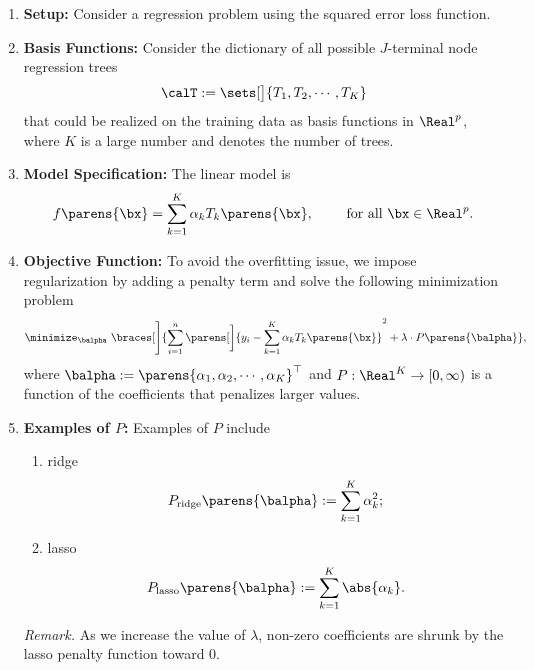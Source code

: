 \documentclass[12pt]{article}
\begin{document}
\begin{enumerate}[label=\textbf{\arabic*.}]
	
	\item \textbf{Setup:} Consider a regression problem using the squared error loss function. 

	\item \textbf{Basis Functions:} Consider the dictionary of all possible $J$-terminal node regression trees 
	\begin{align}\label{eq-dict}
		\calT := \sets[\big]{T_1, T_2, \cdots, T_K} 
	\end{align}
	that could be realized on the training data as basis functions in $\Real^p$, where $K$ is a large number and denotes the number of trees. 
	
	\item \textbf{Model Specification:} The linear model is 
	\begin{align}\label{eq-model}
		f \parens{\bx} = \sum_{k=1}^K \alpha_k T_k \parens{\bx}, \qquad \text{ for all } \bx \in \Real^p. 
	\end{align}
	
	\item \textbf{Objective Function:} To avoid the overfitting issue, we impose regularization by adding a penalty term and solve the following minimization problem 
	\begin{align}\label{eq-obj-func}
		\minimize_{\balpha} \ \braces[\Bigg]{\sum_{i=1}^n \parens[\bigg]{y_i - \sum_{k=1}^K \alpha_k T_k \parens{\bx}}^2 + \lambda \cdot P \parens{\balpha}}, 
	\end{align}
	where $\balpha := \parens{\alpha_1, \alpha_2, \cdots, \alpha_K}^\top$ and $P: \Real^K \to [0, \infty)$ is a function of the coefficients that penalizes larger values. 
	
	\item \textbf{Examples of $P$:} Examples of $P$ include 
	\begin{enumerate}
		\item ridge 
		\begin{align*}
			P_{\mathrm{ridge}} \parens{\balpha} := \sum_{k=1}^K \alpha_k^2; 
		\end{align*} 
		\item lasso 
		\begin{align*}
			P_{\mathrm{lasso}} \parens{\balpha} := \sum_{k=1}^K \abs{\alpha_k}. 
		\end{align*}
	\end{enumerate}
	
	\textit{Remark.} As we increase the value of $\lambda$, non-zero coefficients are shrunk by the lasso penalty function toward 0. 
	

\end{enumerate}
\end{document}
